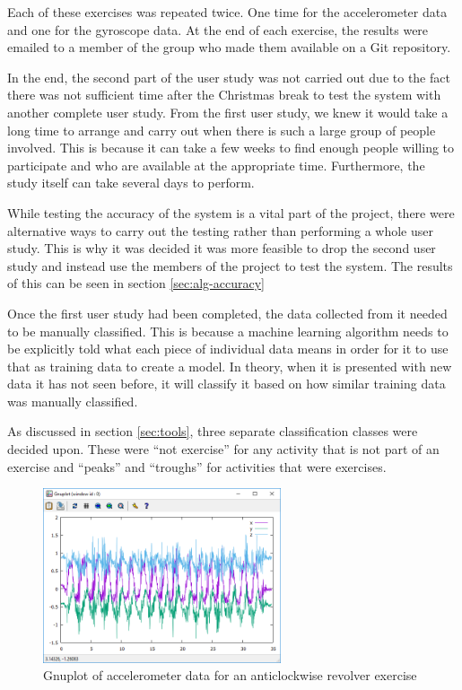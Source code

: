 Each of these exercises was repeated twice. One time for the accelerometer data and one for the gyroscope data. At the end of each exercise, the results were emailed to a member of the group who made them available on a Git repository.

In the end, the second part of the user study was not carried out due to the fact there was not sufficient time after the Christmas break to test the system with another complete user study. From the first user study, we knew it would take a long time to arrange and carry out when there is such a large group of people involved. This is because it can take a few weeks to find enough people willing to participate and who are available at the appropriate time. Furthermore, the study itself can take several days to perform. 

While testing the accuracy of the system is a vital part of the project, there were alternative ways to carry out the testing rather than performing a whole user study. This is why it was decided it was more feasible to drop the second user study and instead use the members of the project to test the system. The results of this can be seen in section \ref{sec:alg-accuracy}

Once the first user study had been completed, the data collected from it needed to be manually classified. This is because a machine learning algorithm needs to be explicitly told what each piece of individual data means in order for it to use that as training data to create a model. In theory, when it is presented with new data it has not seen before, it will classify it based on how similar training data was manually classified.

As discussed in section \ref{sec:tools}, three separate classification classes were decided upon. These were “not exercise” for any activity that is not part of an exercise and “peaks” and “troughs” for activities that were exercises. 

\begin{figure}
	\centering
	\includegraphics[width=70mm]{figures/classification_data_plot.png}
	\caption{Gnuplot of accelerometer data for an anticlockwise revolver exercise\label{fig:gnuplot-rev}}
\end{figure}

